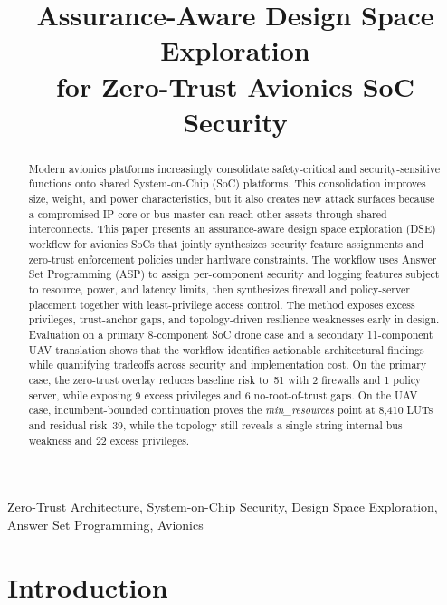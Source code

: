 \documentclass[conference]{IEEEtran}
\begin{document}
\title{Assurance-Aware Design Space Exploration\\
for Zero-Trust Avionics SoC Security}

\author{}

\maketitle

\begin{abstract}
Modern avionics platforms increasingly consolidate safety-critical and
security-sensitive functions onto shared System-on-Chip (SoC) platforms.
This consolidation improves size, weight, and power characteristics, but it
also creates new attack surfaces because a compromised IP core or bus master
can reach other assets through shared interconnects. This paper presents an
assurance-aware design space exploration (DSE) workflow for avionics SoCs
that jointly synthesizes security feature assignments and zero-trust
enforcement policies under hardware constraints. The workflow uses Answer Set
Programming (ASP) to assign per-component security and logging features
subject to resource, power, and latency limits, then synthesizes firewall and
policy-server placement together with least-privilege access control. The
method exposes excess privileges, trust-anchor gaps, and topology-driven
resilience weaknesses early in design. Evaluation on a primary 8-component
SoC drone case and a secondary 11-component UAV translation shows that the
workflow identifies actionable architectural findings while quantifying
tradeoffs across security and implementation cost. On the primary case, the
zero-trust overlay reduces baseline risk to~51 with 2 firewalls and 1 policy
server, while exposing 9 excess privileges and 6 no-root-of-trust gaps. On
the UAV case, incumbent-bounded continuation proves the \textit{min\_resources}
point at 8,410 LUTs and residual risk~39, while the topology still reveals a
single-string internal-bus weakness and 22 excess privileges.
\end{abstract}

\begin{IEEEkeywords}
Zero-Trust Architecture, System-on-Chip Security, Design Space Exploration,
Answer Set Programming, Avionics
\end{IEEEkeywords}

\section{Introduction}
\end{document}
